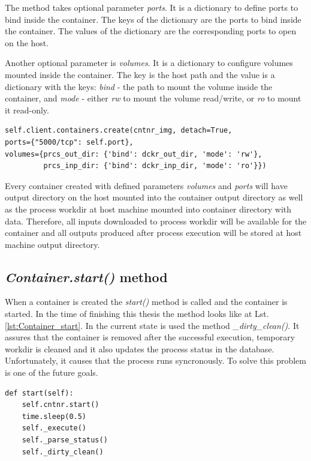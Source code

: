 \documentclass[12pt,a4paper]{article}
\begin{document}
The method takes optional parameter \textit{ports}. It is a dictionary to define ports to bind inside the container. The keys of the
dictionary are the ports to bind inside the container. The values of the dictionary are the corresponding ports to open on the host.

Another optional parameter is \textit{volumes}. It is a dictionary 
to configure volumes mounted inside the container. The key is the host path and the value is a dictionary with the keys: \textit{bind}
- the path to mount the volume inside the container, and \textit{mode} - either \textit{rw} to mount the volume read/write, or 
\textit{ro} to mount it read-only.

\bigskip
\begin{lstlisting}[basicstyle=\small,caption={\textit{create()} method}]
self.client.containers.create(cntnr_img, detach=True,
ports={"5000/tcp": self.port}, 
volumes={prcs_out_dir: {'bind': dckr_out_dir, 'mode': 'rw'},
         prcs_inp_dir: {'bind': dckr_inp_dir, 'mode': 'ro'}})
\end{lstlisting}

Every container created with defined parameters \textit{volumes} and \textit{ports} will have output directory on the host mounted into 
the container output directory as well as the process workdir at host machine mounted into container directory with data. Therefore, all
inputs downloaded to process workdir will be available for the container and all outputs produced after process execution will be stored
at host machine output directory.

\subsection{\textit{Container.start()} method}
When a container is created the \textit{start()} method is called and the container is started.
In the time of finishing this thesis the method looks like at Lst.\ref{lst:Container_start}. In the current state is used the method
\textit{\_dirty\_clean()}. It assures that the container is removed after the successful execution, temporary workdir is cleaned and it also 
updates the process status in the database. Unfortunately, it causes that the process runs syncronously. To solve this problem is one of the
future goals.
 
\begin{lstlisting}[basicstyle=\small,caption={\textit{Container.create()} method},label={lst:Container_start}]
def start(self):
    self.cntnr.start()
    time.sleep(0.5)
    self._execute()
    self._parse_status()
    self._dirty_clean()
\end{lstlisting}
\end{document}
